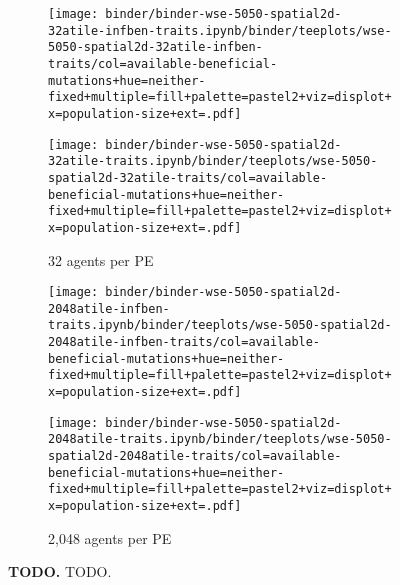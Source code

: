 \begin{figure}[h]
    \begin{subfigure}[b]{\linewidth}
        \begin{minipage}{\textwidth}
          \texttt{[image: binder/binder-wse-5050-spatial2d-32atile-infben-traits.ipynb/binder/teeplots/wse-5050-spatial2d-32atile-infben-traits/col=available-beneficial-mutations+hue=neither-fixed+multiple=fill+palette=pastel2+viz=displot+x=population-size+ext=.pdf]}

          \texttt{[image: binder/binder-wse-5050-spatial2d-32atile-traits.ipynb/binder/teeplots/wse-5050-spatial2d-32atile-traits/col=available-beneficial-mutations+hue=neither-fixed+multiple=fill+palette=pastel2+viz=displot+x=population-size+ext=.pdf]}%
        \end{minipage}
        \begin{minipage}{\textwidth}
        \caption{32 agents per PE}
        \label{fig:neither-fixed-5050-wse:32}
        \end{minipage}%
    \end{subfigure}

\begin{subfigure}[b]{\linewidth}
    \begin{minipage}{\textwidth}
      \texttt{[image: binder/binder-wse-5050-spatial2d-2048atile-infben-traits.ipynb/binder/teeplots/wse-5050-spatial2d-2048atile-infben-traits/col=available-beneficial-mutations+hue=neither-fixed+multiple=fill+palette=pastel2+viz=displot+x=population-size+ext=.pdf]}

      \texttt{[image: binder/binder-wse-5050-spatial2d-2048atile-traits.ipynb/binder/teeplots/wse-5050-spatial2d-2048atile-traits/col=available-beneficial-mutations+hue=neither-fixed+multiple=fill+palette=pastel2+viz=displot+x=population-size+ext=.pdf]}%
    \end{minipage}
    \begin{minipage}{\textwidth}
    \caption{2,048 agents per PE}
    \label{fig:neither-fixed-5050-wse:2048}
    \end{minipage}%
\end{subfigure}


  \begin{minipage}{\textwidth}
    \caption{%
      \textbf{TODO.}
      \footnotesize
     TODO.
    }
    \label{fig:neither-fixed-5050-wse}
  \end{minipage}
\end{figure}
